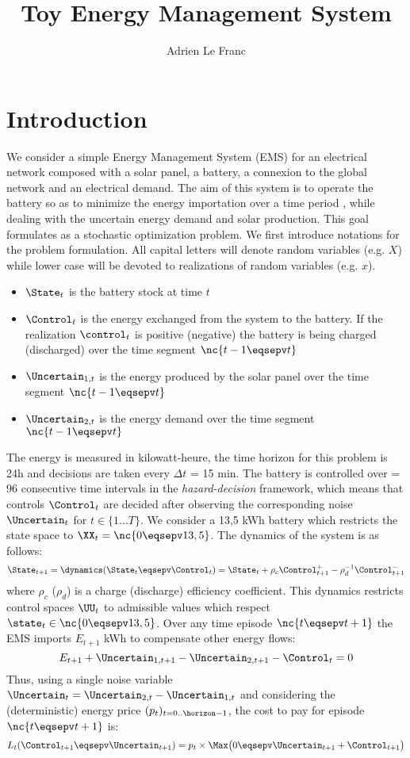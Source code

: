 \documentclass[10pt,a4paper]{article}
\begin{document}
\title{\textbf{Toy Energy Management System}}
\author{Adrien Le Franc}
\date{}
\maketitle

\section{Introduction}

We consider a simple Energy Management System (EMS) for an electrical network composed with a solar panel, a battery, a connexion to the global network and an electrical demand. The aim of this system is to operate the battery so as to minimize the energy importation over a time period \horizon, while dealing with the uncertain energy demand and solar production. This goal formulates as a stochastic optimization problem. We first introduce notations for the problem formulation. All capital letters will denote random variables (e.g. $X$) while lower case will be devoted to realizations of random variables (e.g. $x$).

\begin{itemize}
\item $\State_t$ is the battery stock at time $t$
\item $\Control_t$ is the energy exchanged from the system to the battery. If the realization $\control_t$ is positive (negative) the battery is being charged (discharged) over the time segment $\nc{t-1 \eqsepv t}$
\item $\Uncertain_{1, t}$ is the energy produced by the solar panel over the time segment $\nc{t-1 \eqsepv t}$
\item $\Uncertain_{2, t}$ is the energy demand over the time segment $\nc{t-1 \eqsepv t}$
\end{itemize}

\noindent The energy is measured in kilowatt-heure, the time horizon for this problem is 24h and decisions are taken every $\Delta t$ = 15 min. The battery is controlled over \horizon = 96 consecutive time intervals in the \textit{hazard-decision} framework, which means that controls $\Control_t$ are decided after observing the corresponding noise $\Uncertain_t$ for $t \in \{1...T\}$. We consider a 13,5 kWh battery which restricts the state space to $\XX_t = \nc{0 \eqsepv 13,5}$. The dynamics of the system is as follows:
\[\State_{t+1} =  \dynamics(\State_t \eqsepv \Control_t) = \State_t + \rho_c \Control_{t+1}^+ - \rho_d^{-1} \Control_{t+1}^-\]
where $\rho_c$ ($\rho_d$) is a charge (discharge) efficiency coefficient. This dynamics restricts control spaces $\UU_t$ to admissible values which respect $\state_t \in \nc{0 \eqsepv 13,5}$. Over any time episode $\nc{t \eqsepv t+1}$ the EMS imports $E_{t+1}$ kWh to compensate other energy flows:
\[E_{t+1} + \Uncertain_{1, t+1} - \Uncertain_{2, t+1} - \Control_t = 0\]
Thus, using a single noise variable $\Uncertain_t = \Uncertain_{2, t} - \Uncertain_{1, t}$ and considering the (deterministic) energy price $(p_t)_{t=0..\horizon-1}$, the cost to pay for episode $\nc{t \eqsepv t+1}$ is:
\[L_t(\Control_{t+1} \eqsepv \Uncertain_{t+1}) = p_t \times \Max \big(0 \eqsepv \Uncertain_{t+1} + \Control_{t+1} \big)\]
\end{document}
